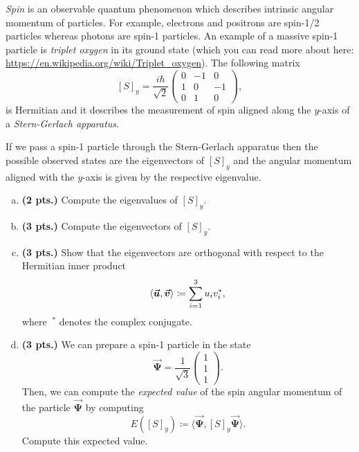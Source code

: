 \documentclass[12pt]{amsbook}
\begin{document}
\newpage
\begin{problem}
\emph{Spin} is an observable quantum phenomenon which describes intrinsic angular momentum of particles.  For example, electrons and positrons are spin-1/2 particles whereas photons are spin-1 particles.  An example of a massive spin-1 particle is \emph{triplet oxygen} in its ground state (which you can read more about here: \url{https://en.wikipedia.org/wiki/Triplet_oxygen}). The following matrix
\[
[S]_y=\frac{i\hbar}{\sqrt{2}}\begin{pmatrix} 0 & -1 & 0 \\ 1 & 0 & -1 \\ 0 & 1 & 0 \end{pmatrix},
\]
is Hermitian and it describes the measurement of spin aligned along the $y$-axis of a \emph{Stern-Gerlach apparatus}.

If we pass a spin-1 particle through the Stern-Gerlach apparatus then the possible observed states are the eigenvectors of $[S]_y$ and the angular momentum aligned with the $y$-axis is given by the respective eigenvalue. 
\begin{enumerate}[(a)]
    \item \textbf{(2 pts.)} Compute the eigenvalues of $[S]_y$.
    \item \textbf{(3 pts.)} Compute the eigenvectors of $[S]_y$.
    \item \textbf{(3 pts.)} Show that the eigenvectors are orthogonal with respect to the Hermitian inner product
    \[
    \langle \boldsymbol{\boldsymbol{\vec{u}}},\boldsymbol{\boldsymbol{\vec{v}}} \rangle \coloneqq \sum_{i=1}^3 u_i v_i^*,
    \]
    where $~^*$ denotes the complex conjugate.
    \item \textbf{(3 pts.)} We can prepare a spin-1 particle in the state
    \[
    \boldsymbol{\vec{\Psi}} = \frac{1}{\sqrt{3}}\begin{pmatrix} 1 \\ 1 \\ 1 \end{pmatrix}.
    \]
    Then, we can compute the \emph{expected value} of the spin angular momentum of the particle $\boldsymbol{\vec{\Psi}}$ by computing
    \[
    E([S]_y) \coloneqq \langle \boldsymbol{\vec{\Psi}}, [S]_y \boldsymbol{\vec{\Psi}} \rangle. 
    \]
    Compute this expected value.
\end{enumerate}
\end{problem}
\end{document}
